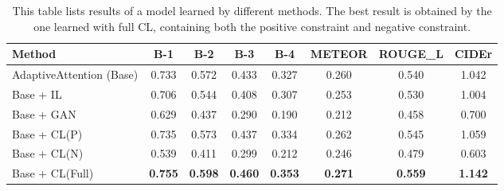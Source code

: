 \begin{table}
\centering
\small
\begin{tabular}{lccccccc}
\toprule
Method & B-1 & B-2 & B-3 & B-4 & METEOR & ROUGE\_L & CIDEr \\
\midrule
AdaptiveAttention \cite{lu2016knowing} (Base) & 0.733 & 0.572 & 0.433 & 0.327 & 0.260 & 0.540 & 1.042 \\
Base + IL \cite{vedantam2017context} & 0.706 & 0.544 & 0.408 & 0.307 & 0.253 & 0.530 & 1.004 \\
Base + GAN \cite{dai2017towards} & 0.629 & 0.437 & 0.290 & 0.190 & 0.212 & 0.458 & 0.700 \\
Base + CL(P) & 0.735 & 0.573 & 0.437 & 0.334 & 0.262 & 0.545 & 1.059 \\
Base + CL(N) & 0.539 & 0.411 & 0.299 & 0.212 & 0.246 & 0.479 & 0.603 \\
Base + CL(Full) & \textbf{0.755} & \textbf{0.598} & \textbf{0.460} & \textbf{0.353} & \textbf{0.271} & \textbf{0.559} & \textbf{1.142} \\
\bottomrule
\end{tabular}
\vspace{1mm}
\caption{\small This table lists results of a model learned by different methods.
The best result is obtained by the one learned with full CL, containing both the positive constraint and negative constraint.}
\label{tab:methods}
\vspace{-5mm}
\end{table}

